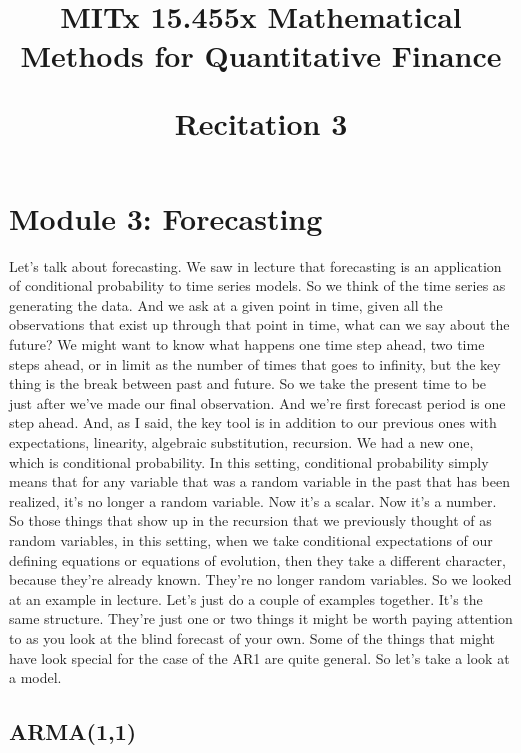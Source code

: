 \documentclass{article}
\begin{document}
	
	\title{MITx 15.455x Mathematical Methods for Quantitative Finance
	 \\
	\begin{large} 
		Recitation 3
	\end{large} }

	
	\maketitle
	
	\section*{Module 3: Forecasting}
	

Let's talk about forecasting.
We saw in lecture that forecasting
is an application of conditional probability to time series
models.
So we think of the time series as generating the data.
And we ask at a given point in time,
given all the observations that exist up
through that point in time, what can we say about the future?
We might want to know what happens one time step ahead,
two time steps ahead, or in limit
as the number of times that goes to infinity,
but the key thing is the break between past and future.
So we take the present time to be just after we've
made our final observation.
And we're first forecast period is one step ahead.
And, as I said, the key tool is in addition to
our previous ones with expectations,
linearity, algebraic substitution, recursion.
We had a new one, which is conditional probability.
In this setting, conditional probability simply
means that for any variable that was
a random variable in the past that has been realized,
it's no longer a random variable.
Now it's a scalar.
Now it's a number.
So those things that show up in the recursion
that we previously thought of as random variables,
in this setting, when we take conditional expectations
of our defining equations or equations of evolution,
then they take a different character,
because they're already known.
They're no longer random variables.
So we looked at an example in lecture.
Let's just do a couple of examples together.
It's the same structure.
They're just one or two things it might be worth
paying attention to as you look at the blind forecast
of your own.
Some of the things that might have look special for the case
of the AR1 are quite general.
So let's take a look at a model.

\subsection*{ARMA(1,1)}
\end{document}
